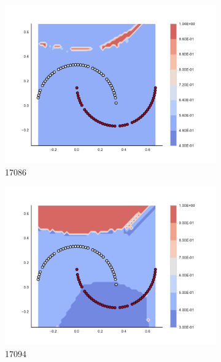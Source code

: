 \begin{figure}[h]
\begin{subfigure}[b]{0.09\textwidth}
    \includegraphics[clip, trim=2.35cm 1.75cm 4.5cm 0cm,width=\textwidth]{img/convergence/17086.pdf}
    \caption{17086}
    \label{fig:convergence_17086}
\end{subfigure}
%
\begin{subfigure}[b]{0.09\textwidth}
    \includegraphics[clip, trim=2.35cm 1.75cm 4.5cm 0cm,width=\textwidth]{img/convergence/17094.pdf}
    \caption{17094}
    \label{fig:convergence_17094}
\end{subfigure}
%
\begin{subfigure}[b]{0.09\textwidth}

\end{subfigure}
\end{figure}
